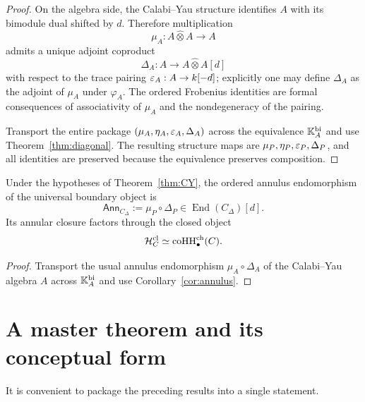 \begin{proof}
On the algebra side, the Calabi--Yau structure identifies $A$ with its bimodule dual shifted by
$d$. Therefore multiplication
\[
\mu_A:A\widehat\otimes A\to A
\]
admits a unique adjoint coproduct
\[
\Delta_A:A\to A\widehat\otimes A[d]
\]
with respect to the trace pairing $\varepsilon_A:A\to k[-d]$; explicitly one may define $\Delta_A$ as the
adjoint of $\mu_A$ under $\varphi_A$. The ordered Frobenius identities are formal consequences of
associativity of $\mu_A$ and the nondegeneracy of the pairing.

Transport the entire package $(\mu_A,\eta_A,\varepsilon_A,\Delta_A)$ across the equivalence
$\mathbb{K}_A^{\mathrm{bi}}$ and use Theorem~\ref{thm:diagonal}. The resulting structure maps are
$\mu_P,\eta_P,\varepsilon_P,\Delta_P$, and all identities are preserved because the equivalence preserves
composition.
\end{proof}

\begin{corollary}
Under the hypotheses of Theorem~\ref{thm:CY}, the ordered annulus endomorphism of the universal
boundary object is
\[
\mathsf{Ann}_{C_\Delta}:=\mu_P\circ \Delta_P\in \operatorname{End}(C_\Delta)[d].
\]
Its annular closure factors through the closed object
\[
\mathcal H_C^{\mathrm{cl}}\simeq \operatorname{coHH}^{\mathrm{ch}}_\bullet(C).
\]
\end{corollary}

\begin{proof}
Transport the usual annulus endomorphism $\mu_A\circ \Delta_A$ of the Calabi--Yau algebra $A$ across
$\mathbb{K}_A^{\mathrm{bi}}$ and use Corollary~\ref{cor:annulus}.
\end{proof}

\section{A master theorem and its conceptual form}

It is convenient to package the preceding results into a single statement.

